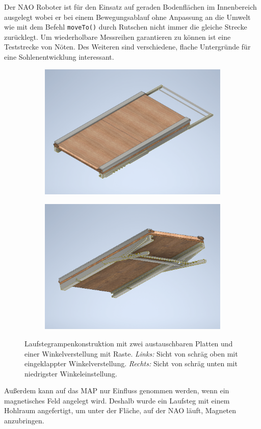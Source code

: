 Der NAO Roboter ist für den Einsatz auf geraden Bodenflächen im Innenbereich ausgelegt wobei er bei einem Bewegungsablauf ohne Anpassung an die Umwelt wie mit dem Befehl \texttt{moveTo()} durch Rutschen nicht immer die gleiche Strecke zurücklegt. 
Um wiederholbare Messreihen garantieren zu können ist eine Teststrecke von Nöten. Des Weiteren sind verschiedene, flache Untergründe für eine Sohlenentwicklung interessant.
\begin{figure}[hb]
	\hfill
	\begin{subfigure}[c]{.49\linewidth}
		\centering
		\includegraphics[width=\linewidth]{Bilder/Rampe_oben.png}
	\end{subfigure}
	\begin{subfigure}[c]{.49\linewidth}
		\centering
		\includegraphics[width=\linewidth]{Bilder/Rampe_unten.png}
	\end{subfigure}
	\hfill
	\caption{Laufstegrampenkonstruktion mit zwei austauschbaren Platten und einer Winkelverstellung mit Raste. \textit{Links:} Sicht von schräg oben mit eingeklappter Winkelverstellung. \textit{Rechts:} Sicht von schräg unten mit niedrigster Winkeleinstellung.}
	\label{Rampe_Inventor}
\end{figure}
Außerdem kann auf das MAP nur Einfluss genommen werden, wenn ein magnetisches Feld angelegt wird. Deshalb wurde ein Laufsteg mit einem Hohlraum angefertigt, um unter der Fläche, auf der NAO läuft, Magneten anzubringen. 

